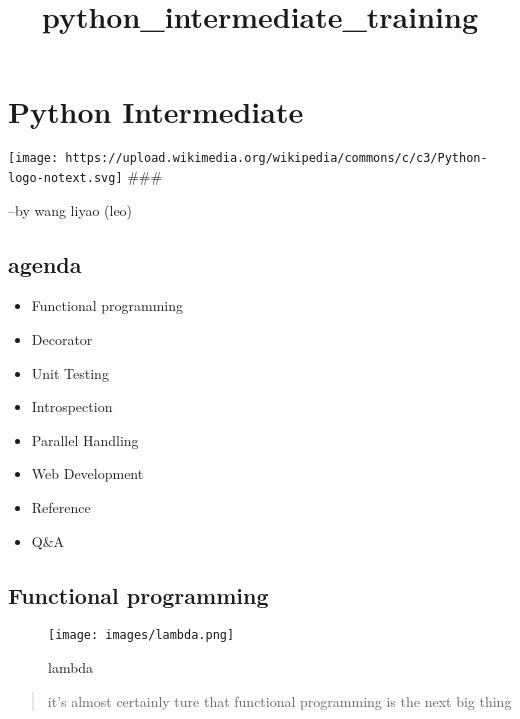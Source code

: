 \documentclass[11pt]{article}
\title{python\_intermediate\_training}
\makeatletter
\def\maxwidth{\ifdim\Gin@nat@width>\linewidth\linewidth
    \else\Gin@nat@width\fi}
\let\Oldincludegraphics\includegraphics
\renewcommand{\includegraphics}[1]{\Oldincludegraphics[width=.8\maxwidth]{#1}}
\providecommand{\tightlist}{%
      \setlength{\itemsep}{0pt}\setlength{\parskip}{0pt}}
\makeatother
\begin{document}
    
    
    \maketitle
    
    

    
    \hypertarget{python-intermediate}{%
\section{Python Intermediate}\label{python-intermediate}}

\texttt{[image: https://upload.wikimedia.org/wikipedia/commons/c/c3/Python-logo-notext.svg]}
\#\#\#

--by wang liyao (leo)

\hypertarget{section}{%
\subsubsection{}\label{section}}

    \hypertarget{agenda}{%
\subsection{agenda}\label{agenda}}

\begin{itemize}
\tightlist
\item
  Functional programming
\item
  Decorator
\item
  Unit Testing
\item
  Introspection
\item
  Parallel Handling
\item
  Web Development
\item
  Reference
\item
  Q\&A
\end{itemize}

    \hypertarget{functional-programming}{%
\subsection{Functional programming}\label{functional-programming}}

\begin{figure}
\centering
\texttt{[image: images/lambda.png]}
\caption{lambda}
\end{figure}

    \begin{quote}
it's almost certainly ture that functional programming is the next big
thing
\end{quote}
\end{document}
